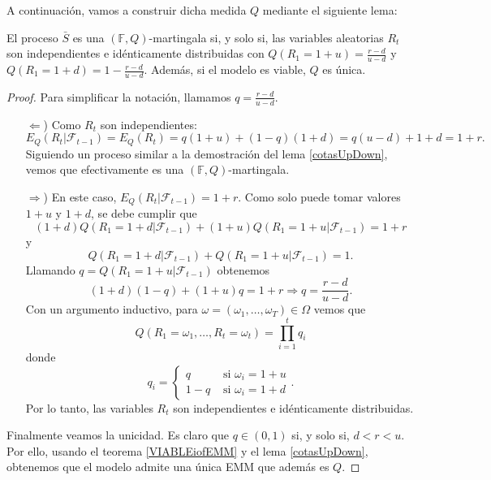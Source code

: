 A continuación, vamos a construir dicha medida $ Q $ mediante el siguiente lema:
\bigskip
\begin{lemaBox}
	El proceso $ \bar{S} $ es una $ (\mathbb{F},Q) $-martingala si, y solo si, las variables aleatorias $ R_t $ son independientes e idénticamente distribuidas con $ Q(R_1 = 1+u) = \frac{r-d}{u-d}$ y $ Q(R_1 = 1+d) = 1- \frac{r-d}{u-d} $. Además, si el modelo es viable, $ Q $ es única.
\end{lemaBox} 
\begin{proof}
	Para simplificar la notación, llamamos $ q =  \frac{r-d}{u-d}$.
	\begin{itemize}
		\item[$ \Longleftarrow $)] Como $ R_t $ son independientes:
		\[
		E_Q(R_t | \mathcal{F}_{t-1}) = E_Q(R_t) = q(1+u) + (1-q)(1+d) = q(u-d) + 1 +d = 1+r.
		\]
		Siguiendo un proceso similar a la demostración del lema \ref{cotasUpDown}, vemos que efectivamente es una $ (\mathbb{F},Q) $-martingala.
		\item[$ \Longrightarrow $)] En este caso, $ E_Q(R_t | \mathcal{F}_{t-1}) = 1+r $. Como solo puede tomar valores $ 1+u $ y $ 1+d $, se debe cumplir que
		\[
		(1+d)Q(R_1 = 1+d | \mathcal{F}_{t-1}) + (1+u)Q(R_1 = 1+u | \mathcal{F}_{t-1}) = 1+r
		\]
		y
		\[
		Q(R_1 = 1+d | \mathcal{F}_{t-1}) + Q(R_1 = 1+u | \mathcal{F}_{t-1}) = 1.
		\]
		Llamando $ q =  Q(R_1 = 1+u | \mathcal{F}_{t-1})$ obtenemos
		\[
		(1+d)(1-q) + (1+u)q = 1+r \Longrightarrow q = \frac{r-d}{u-d}.
		\]
		Con un argumento inductivo, para $ \omega = (\omega_1,\dots,\omega_T) \in \Omega $ vemos que
		\[
		Q(R_1 = \omega_1,\dots,R_t = \omega_t) = \prod_{i=1}^{t}q_i
		\]
		donde
		\[
		q_i =  \begin{cases}
		q & \text{ si } \omega_i = 1+u\\
		1-q& \text{ si } \omega_i = 1+d
		\end{cases}.
		\]
		Por lo tanto, las variables $ R_t $ son independientes e idénticamente distribuidas.
	\end{itemize}
	
	Finalmente veamos la unicidad. Es claro que $ q \in (0,1) $ si, y solo si, $ d<r<u $. Por ello, usando el teorema \ref{VIABLEiofEMM} y el lema \ref{cotasUpDown}, obtenemos que el modelo admite una única EMM que además es $ Q $.
\end{proof}
\bigskip

